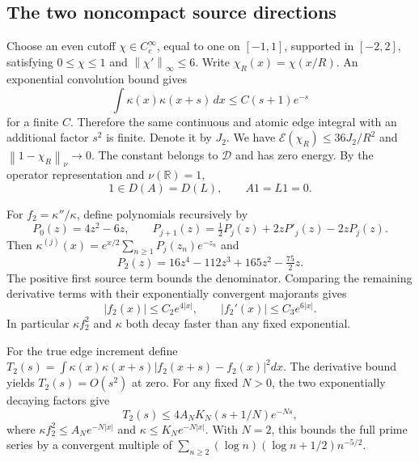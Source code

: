 \documentclass[11pt,a4paper]{article}
\numberwithin{equation}{section}
\theoremstyle{definition}\newtheorem{definition}[theorem]{Definition}
\theoremstyle{remark}\newtheorem{remark}[theorem]{Remark}
\newcommand{\DD}{\mathcal D}
\newcommand{\EE}{\mathcal E}
\newcommand{\R}{\mathbb R}
\newcommand{\norm}[1]{\left\|#1\right\|}
\begin{document}
\subsection{The two noncompact source directions}
Choose an even cutoff $\chi\in C_c^\infty$, equal to one on $[-1,1]$, supported in $[-2,2]$, satisfying $0\le\chi\le1$ and $\norm{\chi'}_\infty\le6$. Write $\chi_R(x)=\chi(x/R)$. An exponential convolution bound gives
\begin{equation}\label{eq:sourceconv}
 \int\kappa(x)\kappa(x+s)\,dx\le C(s+1)e^{-s}
\end{equation}
for a finite $C$. Therefore the same continuous and atomic edge integral with an additional factor $s^2$ is finite. Denote it by $J_2$. We have
$\EE(\chi_R)\le36J_2/R^2$ and $\norm{1-\chi_R}_\nu\to0$.
The constant belongs to $\DD$ and has zero energy. By the operator representation and $\nu(\R)=1$,
\begin{equation}\label{eq:constant}
 1\in D(A)=D(L),\qquad A1=L1=0.
\end{equation}

For $f_2=\kappa''/\kappa$, define polynomials recursively by
\begin{equation}\label{eq:Pj}
 P_0(z)=4z^2-6z,\qquad
 P_{j+1}(z)=\tfrac12P_j(z)+2zP'_j(z)-2zP_j(z).
\end{equation}
Then $\kappa^{(j)}(x)=e^{x/2}\sum_{n\ge1}P_j(z_n)e^{-z_n}$ and
\begin{equation}\label{eq:P2}
 P_2(z)=16z^4-112z^3+165z^2-\tfrac{75}{2}z.
\end{equation}
The positive first source term bounds the denominator. Comparing the remaining derivative terms with their exponentially convergent majorants gives
\begin{equation}\label{eq:ratio_growth}
 |f_2(x)|\le C_2e^{4|x|},\qquad |f_2'(x)|\le C_3e^{6|x|}.
\end{equation}
In particular $\kappa f_2^2$ and $\kappa$ both decay faster than any fixed exponential.

For the true edge increment define
$T_2(s)=\int\kappa(x)\kappa(x+s)|f_2(x+s)-f_2(x)|^2dx$.
The derivative bound yields $T_2(s)=O(s^2)$ at zero. For any fixed $N>0$, the two exponentially decaying factors give
\begin{equation}\label{eq:T2}
 T_2(s)\le4A_NK_N(s+1/N)e^{-Ns},
\end{equation}
where $\kappa f_2^2\le A_Ne^{-N|x|}$ and $\kappa\le K_Ne^{-N|x|}$. With $N=2$, this bounds the full prime series by a convergent multiple of
$\sum_{n\ge2}(\log n)(\log n+1/2)n^{-5/2}$.
\end{document}

